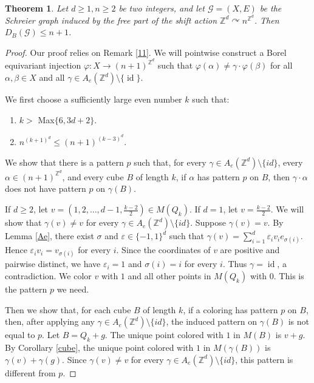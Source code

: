 \documentclass[11pt, reqno, a4paper]{amsart}
\theoremstyle{plain}
\newtheorem{theorem}{Theorem}[section]
\theoremstyle{definition}
\theoremstyle{remark}
\newcommand{\id}{\operatorname{id}}
\begin{document}
\begin{theorem}\label{upperbound}
Let $d\ge 1, n\ge 2$ be two integers, and let $\mathcal{G}=(X,E)$ be the Schreier graph induced by the free part of the shift action $\mathbb{Z}^d \curvearrowright n^{\mathbb{Z}^d}$. Then $D_{B}(\mathcal{G})\le n+1$.
\end{theorem}
\begin{proof}
Our proof relies on  Remark  \ref{11}. We will pointwise construct a Borel equivariant injection $\varphi: X\longrightarrow (n+1)^{\mathbb{Z}^d}$ such that $\varphi(\alpha)\ne\gamma\cdot\varphi(\beta)$ for all $\alpha,\beta\in X$ and all $\gamma\in A_e(\mathbb{Z}^d)\setminus\{\id\}$. 

We first choose a sufficiently large even number $k$ such that:
\begin{enumerate}
    \item $k>$ Max$\{6,3d+2\}$.
    \item $n^{(k+1)^d}\leq (n+1)^{(k-3)^d}$.
\end{enumerate}
We  show that there is a pattern $p$ such that, for
every  $\gamma\in A_e(\mathbb{Z}^d)\setminus\{id\}$, every
$\alpha\in (n+1)^{\mathbb{Z}^d}$, and every cube $B$ of length
$k$, if $\alpha$ has pattern $p$ on $B$, then
$\gamma\cdot\alpha$ does not have pattern $p$ on
$\gamma(B)$.
 
If $d\ge 2$, let
$v=(1,2,\dots,d-1,\frac{k-2}{2})\in M(Q_k)$. If $d=1$, let
$v=\frac{k-2}{2}$. We will show that $\gamma(v)\neq v$ for every 
$\gamma\in A_e(\mathbb{Z}^d)\setminus\{id\}$. Suppose $\gamma(v)=v$.
By Lemma \ref{Ae}, there exist $\sigma$ and
$\varepsilon\in\{-1,1\}^d$ such that $\gamma(v)=\sum_{i=1}^d \varepsilon_i v_i e_{\sigma(i)}.$ Hence $\varepsilon_i v_i=v_{\sigma(i)}$ for every $i$. Since the coordinates of $v$ are positive and pairwise distinct, we have $\varepsilon_i=1$ and $\sigma(i)=i$
for every $i$. Thus $\gamma=\id$, a contradiction. We color $v$ with $1$ and
all other points in $M(Q_k)$ with $0$. This is the pattern
$p$ we need.

Then we show that, for each cube $B$ of length $k$, if a
coloring has pattern $p$ on $B$, then, after applying any
 $\gamma\in A_e(\mathbb{Z}^d)\setminus\{id\}$, the induced pattern
on $\gamma(B)$ is not equal to $p$. Let $B=Q_k+g$. The unique
point colored with $1$ in $M(B)$ is $v+g$. By
Corollary \ref{cube},  the unique point colored with $1$ in  $M(\gamma(B))$ is $\gamma(v)+\gamma(g)$. Since
$\gamma(v)\neq v$ for every 
$\gamma\in A_e(\mathbb{Z}^d)\setminus\{id\}$, this  pattern is
different from $p$.




\end{proof}
\end{document}
